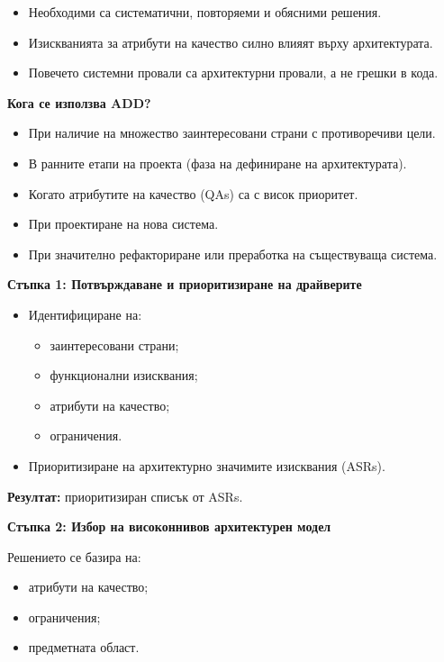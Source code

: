 \documentclass{article}
\renewcommand{\\}{\newline}
\begin{document}
\begin{itemize}
    \item Необходими са систематични, повторяеми и обясними решения.
    \item Изискванията за атрибути на качество силно влияят върху архитектурата.
    \item Повечето системни провали са архитектурни провали, а не грешки в кода.
\end{itemize}

\textbf{Кога се използва ADD?}

\begin{itemize}
    \item При наличие на множество заинтересовани страни с противоречиви цели.
    \item В ранните етапи на проекта (фаза на дефиниране на архитектурата).
    \item Когато атрибутите на качество (QAs) са с висок приоритет.
    \item При проектиране на нова система.
    \item При значително рефакториране или преработка на съществуваща система.
\end{itemize}

\textbf{Стъпка 1: Потвърждаване и приоритизиране на драйверите}

\begin{itemize}
    \item Идентифициране на:
    \begin{itemize}
        \item заинтересовани страни;
        \item функционални изисквания;
        \item атрибути на качество;
        \item ограничения.
    \end{itemize}
    \item Приоритизиране на архитектурно значимите изисквания (ASRs).
\end{itemize}

\textbf{Резултат:} приоритизиран списък от ASRs.

\textbf{Стъпка 2: Избор на високоннивов архитектурен модел}

Решението се базира на:
\begin{itemize}
    \item атрибути на качество;
    \item ограничения;
    \item предметната област.
\end{itemize}
\end{document}
